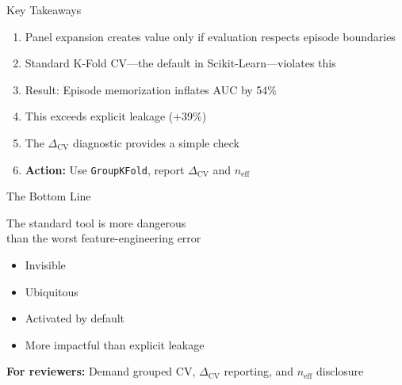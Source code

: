 \documentclass[aspectratio=169]{beamer}
\begin{document}
\begin{frame}{Key Takeaways}
\begin{enumerate}
\item Panel expansion creates value \alert{only if evaluation respects episode boundaries}

\vspace{0.5em}
\item Standard K-Fold CV—\alert{the default in Scikit-Learn}—violates this

\vspace{0.5em}
\item Result: \alert{Episode memorization} inflates AUC by 54\%

\vspace{0.5em}
\item This \alert{exceeds explicit leakage} (+39\%)

\vspace{0.5em}
\item The $\Delta_{\text{CV}}$ diagnostic provides a simple check

\vspace{0.5em}
\item \textbf{Action:} Use \texttt{GroupKFold}, report $\Delta_{\text{CV}}$ and $n_{\text{eff}}$
\end{enumerate}
\end{frame}

\begin{frame}{The Bottom Line}
\begin{center}
\LARGE
\alert{The standard tool is more dangerous}\\[0.3em]
\alert{than the worst feature-engineering error}

\vspace{2em}
\Large
{}
\begin{itemize}
\item Invisible
\item Ubiquitous  
\item Activated by default
\item More impactful than explicit leakage
\end{itemize}

\vspace{1em}
\normalsize
\textbf{For reviewers:} Demand grouped CV, $\Delta_{\text{CV}}$ reporting, and $n_{\text{eff}}$ disclosure
\end{center}
\end{frame}
\end{document}
